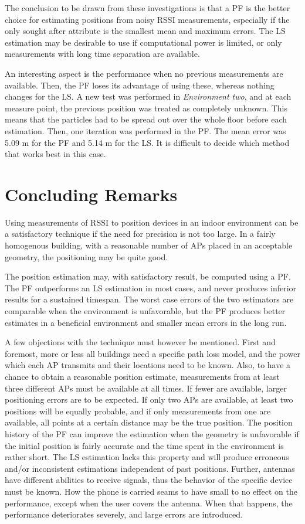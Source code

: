\documentclass{LTHthesis}
\begin{document}
The conclusion to be drawn from these investigations is that a PF is the better choice for estimating positions from noisy RSSI measurements, especially if the only sought after attribute is the smallest mean and maximum errors. The LS estimation may be desirable to use if computational power is limited, or only measurements with long time separation are available.

An interesting aspect is the performance when no previous measurements are available. Then, the PF loses its advantage of using these, whereas nothing changes for the LS. A new test was performed in \emph{Environment two}, and at each measure point, the previous position was treated as completely unknown. This means that the particles had to be spread out over the whole floor before each estimation. Then, one iteration was performed in the PF. The mean error was 5.09 m for the PF and 5.14 m for the LS. It is difficult to decide which method that works best in this case. 

%
\section{Concluding Remarks}
%
Using measurements of RSSI to position devices in an indoor environment can be a satisfactory technique if the need for precision is not too large. In a fairly homogenous building, with a reasonable number of APs placed in an acceptable geometry, the positioning may be quite good. 

The position estimation may, with satisfactory result, be computed using a PF. The PF outperforms an LS estimation in most cases, and never produces inferior results for a sustained timespan. The worst case errors of the two estimators are comparable when the environment is unfavorable, but the PF produces better estimates in a beneficial environment and smaller mean errors in the long run. 

A few objections with the technique must however be mentioned. First and foremost, more or less all buildings need a specific path loss model, and the power which each AP transmits and their locations need to be known. Also, to have a chance to obtain a reasonable position estimate, measurements from at least three different APs must be available at all times. If fewer are available, larger positioning errors are to be expected. If only two APs are available, at least two positions will be equally probable, and if only measurements from one are available, all points at a certain distance may be the true position. The position history of the PF can improve the estimation when the geometry is unfavorable if the initial position is fairly accurate and the time spent in the environment is rather short. The LS estimation lacks this property and will produce erroneous and/or inconsistent estimations independent of past positions. Further, antennas have different abilities to receive signals, thus the behavior of the specific device must be known. How the phone is carried seams to have small to no effect on the performance, except when the user covers the antenna. When that happens, the performance deteriorates severely, and large errors are introduced.   
\end{document}
